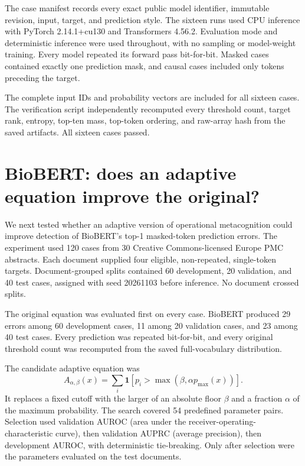 \documentclass[11pt,a4paper]{article}
\begin{document}
The case manifest records every exact public model identifier, immutable revision, input, target, and prediction style. The sixteen runs used CPU inference with PyTorch 2.14.1+cu130 and Transformers 4.56.2. Evaluation mode and deterministic inference were used throughout, with no sampling or model-weight training. Every model repeated its forward pass bit-for-bit. Masked cases contained exactly one prediction mask, and causal cases included only tokens preceding the target.

The complete input IDs and probability vectors are included for all sixteen cases. The verification script independently recomputed every threshold count, target rank, entropy, top-ten mass, top-token ordering, and raw-array hash from the saved artifacts. All sixteen cases passed.

\section{BioBERT: does an adaptive equation improve the original?}
We next tested whether an adaptive version of operational metacognition could improve detection of BioBERT's top-1 masked-token prediction errors. The experiment used 120 cases from 30 Creative Commons-licensed Europe PMC abstracts. Each document supplied four eligible, non-repeated, single-token targets. Document-grouped splits contained 60 development, 20 validation, and 40 test cases, assigned with seed 20261103 before inference. No document crossed splits.

The original equation was evaluated first on every case. BioBERT produced 29 errors among 60 development cases, 11 among 20 validation cases, and 23 among 40 test cases. Every prediction was repeated bit-for-bit, and every original threshold count was recomputed from the saved full-vocabulary distribution.

The candidate adaptive equation was
\begin{equation}
A_{\alpha,\beta}(x)=\sum_i\mathbf{1}\!\left[p_i>\max\!\left(\beta,\alpha p_{\max}(x)\right)\right].
\label{eq:adaptive-volume}
\end{equation}
It replaces a fixed cutoff with the larger of an absolute floor $\beta$ and a fraction $\alpha$ of the maximum probability. The search covered 54 predefined parameter pairs. Selection used validation AUROC (area under the receiver-operating-characteristic curve), then validation AUPRC (average precision), then development AUROC, with deterministic tie-breaking. Only after selection were the parameters evaluated on the test documents.
\end{document}

